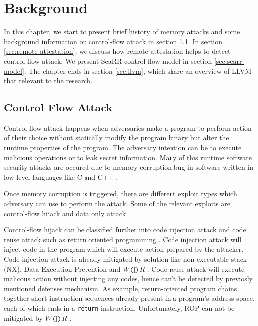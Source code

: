 
\chapter{Background} %

\label{Chapter3} %

In this chapter, we start to present brief history of memory attacks and some
background information on control-flow attack in section
\ref{sec:control-flow-attack}. In section \ref{sec:remote-attestation}, we
discuss how remote attestation helps to detect control-flow attack. We present
ScaRR control flow model in section \ref{sec:scarr-model}. The chapter ends in
section \ref{sec:llvm}, which share an overview of LLVM that relevant to the
research. 

\section{Control Flow Attack}
\label{sec:control-flow-attack}

Control-flow attack happens when adversaries make a program to perform action of
their choice without statically modify the program binary but alter the runtime
properties of the program. The adversary intention can be to execute malicious
operations or to leak secret information. Many of this runtime software security
attacks are occured due to memory corruption bug in software written in
low-level languages like C and C++ \cite{szekeresSoKEternalWar2013}.

Once memory corruption is triggered, there are different exploit types which
adversary can use to perform the attack. Some of the relevant exploits are
control-flow hijack \cite{shachamGeometryInnocentFlesh2007,
schusterCounterfeitObjectorientedProgramming2015}  and data only attack
\cite{chenNonControlDataAttacksAre2005,
carliniControlFlowBendingEffectiveness2015}. 

Control-flow hijack can be classified further into code injection attack and
code reuse attack such as return oriented programming
\cite{roemerReturnorientedProgrammingSystems2012}.  Code injection attack will
inject code in the program which will execute action prepared by the attacker.
Code injection attack is already mitigated by solution like non-executable stack
(NX), Data Execution Prevention and \( W \bigoplus R \)
\cite{vanderveenMemoryErrorsPresent2012}. Code reuse attack will execute
malicous action without injecting any codes, hence can't be detected by
previosly mentioned defenses mechanism. As example, return-oriented program
chains together short instruction sequences already present in a program’s
address space, each of which ends in a \texttt{return} instruction.
Unfortunately, ROP can not be mitigated by \( W \bigoplus R \)
\cite{roemerReturnorientedProgrammingSystems2012}.


